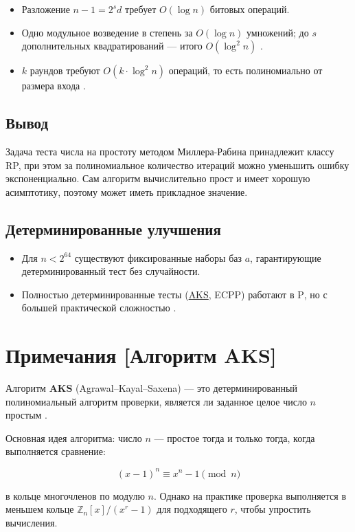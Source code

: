 \documentclass[a4paper,12pt]{article}
\begin{document}
\begin{itemize}
  \item Разложение \(n-1 = 2^s d\) требует \(O(\log n)\) битовых операций.
  \item Одно модульное возведение в степень за \(O(\log n)\) умножений; до \(s\) дополнительных квадратирований — итого \(O(\log^2 n)\) \cite{WikipediaMR}.
  \item \(k\) раундов требуют \(O(k\cdot\log^2 n)\) операций, то есть полиномиально от размера входа \cite{WikipediaMR}.
\end{itemize}

\subsection{Вывод}
Задача теста числа на простоту методом Миллера-Рабина принадлежит классу RP, при этом за полиномиальное количество итераций можно уменьшить ошибку экспоненциально. Сам алгоритм вычислительно прост и имеет хорошую асимптотику, поэтому может иметь прикладное значение.

\subsection{Детерминированные улучшения}

\begin{itemize}
  \item Для \(n<2^{64}\) существуют фиксированные наборы баз \(a\), гарантирующие детерминированный тест без случайности.
  \item Полностью детерминированные тесты (\hyperref[sec:aks]{AKS}, ECPP) работают в \(\mathrm{P}\), но с большей практической сложностью \cite{ANUPrimality}.
\end{itemize}

\newpage

\section{Примечания [Алгоритм AKS]}
\label{sec:aks}

Алгоритм \textbf{AKS} (Agrawal–Kayal–Saxena) — это детерминированный полиномиальный алгоритм проверки, является ли заданное целое число $n$ простым \cite{AKS}.

Основная идея алгоритма: число $n$ — простое тогда и только тогда, когда выполняется сравнение:

\[
(x - 1)^n \equiv x^n - 1 \pmod{n}
\]

в кольце многочленов по модулю $n$. Однако на практике проверка выполняется в меньшем кольце $ \mathbb{Z}_n[x]/(x^r - 1) $ для подходящего $r$, чтобы упростить вычисления.
\end{document}
